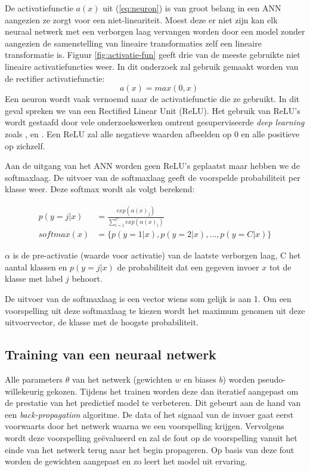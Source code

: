 \npar De activatiefunctie $a(x)$ uit (\ref{eq:neuron}) is van groot belang in een ANN aangezien ze zorgt voor een niet-lineariteit. Moest deze er niet zijn kan elk neuraal netwerk met een verborgen laag vervangen worden door een model zonder aangezien de samenstelling van lineaire transformaties zelf een lineaire transformatie is. Figuur \ref{fig:activatie-fun} geeft drie van de meeste gebruikte niet lineaire activatiefuncties weer. In dit onderzoek zal gebruik gemaakt worden van de rectifier activatiefunctie:
\begin{equation}
\quad a(x) = max(0,x)
\end{equation}
Een neuron wordt vaak vernoemd naar de activatiefunctie die ze gebruikt. In dit geval spreken we van een Rectified Linear Unit (ReLU). Het gebruik van ReLU's wordt gestaafd door vele onderzoekswerken omtrent gesuperviseerde \textit{deep learning} zoals \cite{ReLU}, \cite{lionel} en \cite{wu_deep_2016}. Een ReLU zal alle negatieve waarden afbeelden op 0 en alle positieve op zichzelf.

\npar Aan de uitgang van het ANN worden geen ReLU's geplaatst maar hebben we de softmaxlaag. De uitvoer van de softmaxlaag geeft de voorspelde probabiliteit per klasse weer. Deze softmax wordt als volgt berekend:

\begin{equation}
\begin{aligned}
p(y = j | x) &= \frac{exp(\alpha(x)_j)}{\sum_{i=1}^{C}exp(\alpha(x)_i)}\\
softmax(x) &= \{p(y = 1 | x), p(y = 2 | x), ... , p(y = C | x)\}
\end{aligned}
\end{equation}

\npar $\alpha$ is de pre-activatie (waarde voor activatie) van de laatste verborgen laag, C het aantal klassen en $p(y=j|x)$ de probabiliteit dat een gegeven invoer $x$ tot de klasse met label $j$ behoort.

\npar De uitvoer van de softmaxlaag is een vector wiens som gelijk is aan 1. Om een voorspelling uit deze softmaxlaag te kiezen wordt het maximum genomen uit deze uitvoervector, de klasse met de hoogste probabiliteit. 

\subsection{Training van een neuraal netwerk}
Alle parameters $\theta$ van het netwerk (gewichten $w$ en biases $b$) worden pseudo-willekeurig gekozen. Tijdens het trainen worden deze dan iteratief aangepast om de prestatie van het predictief model te verbeteren. Dit gebeurt aan de hand van een \textit{back-propagation} algoritme. De data of het signaal van de invoer gaat eerst voorwaarts door het netwerk waarna we een voorspelling krijgen. Vervolgens wordt deze voorspelling ge\"evalueerd en zal de fout op de voorspelling vanuit het einde van het netwerk terug naar het begin propageren. Op basis van deze fout worden de gewichten aangepast en zo leert het model uit ervaring.

